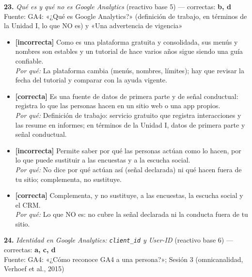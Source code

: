 \documentclass[10pt,letterpaper]{article}
\begin{document}
{\begin{itemize}[leftmargin=1.2em,itemsep=0pt,topsep=1pt,parsep=0pt]
\end{itemize}
\vspace{3pt}\noindent\textbf{23.} \textit{Qué es y qué no es Google Analytics} (reactivo base 5) — correctas: \textbf{b, d}\\[-1pt]
{\scriptsize Fuente: GA4: «¿Qué es Google Analytics?» (definición de trabajo, en términos de la Unidad I, lo que NO es) y «Una advertencia de vigencia»}
\begin{itemize}[leftmargin=1.2em,itemsep=0pt,topsep=1pt,parsep=0pt]
\item[\textbf{a)}] {\footnotesize \textbf{[incorrecta]} Como es una plataforma gratuita y consolidada, sus menús y nombres son estables y un tutorial de hace varios años sigue siendo una guía confiable.\\ \textit{Por qué:} La plataforma cambia (menús, nombres, límites); hay que revisar la fecha del tutorial y comparar con la ayuda vigente.}
\item[\textbf{b)}] {\footnotesize \textbf{[correcta]} Es una fuente de datos de primera parte y de señal conductual: registra lo que las personas hacen en un sitio web o una app propios.\\ \textit{Por qué:} Definición de trabajo: servicio gratuito que registra interacciones y las resume en informes; en términos de la Unidad I, datos de primera parte y señal conductual.}
\item[\textbf{c)}] {\footnotesize \textbf{[incorrecta]} Permite saber por qué las personas actúan como lo hacen, por lo que puede sustituir a las encuestas y a la escucha social.\\ \textit{Por qué:} No dice por qué actúan así (señal declarada) ni qué hacen fuera de tu sitio; complementa, no sustituye.}
\item[\textbf{d)}] {\footnotesize \textbf{[correcta]} Complementa, y no sustituye, a las encuestas, la escucha social y el CRM.\\ \textit{Por qué:} Lo que NO es: no cubre la señal declarada ni la conducta fuera de tu sitio.}
\end{itemize}
\vspace{3pt}\noindent\textbf{24.} \textit{Identidad en Google Analytics: \texttt{client\_id} y User-ID} (reactivo base 6) — correctas: \textbf{a, c, d}\\[-1pt]
{\scriptsize Fuente: GA4: «¿Cómo reconoce GA4 a una persona?»; Sesión 3 (omnicanalidad, Verhoef et al., 2015)}
\begin{itemize}[leftmargin=1.2em,itemsep=0pt,topsep=1pt,parsep=0pt]

\end{itemize}}
\end{document}
